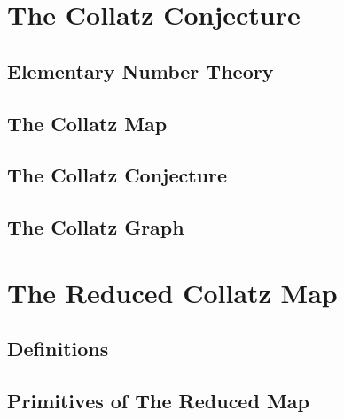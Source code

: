 \begin{abstract}
This is a collection of autoformalizations of definitions and elementary lemmas associated
with the Collatz Conjecture. The focus is first on facts needed to build up recent arguments
by Rozier and Terracol\cite{rozier2025paradoxical}. Secondly, we attempt to be more complete
regarding elementary lemmas to
allow shorter proofs of more advanced theorems. The work is motivated by an urge to understand
current research better, but also by the idea of a specialized library of autoformalizations,
should the need arise for it.
\end{abstract}

\chapter{The Collatz Conjecture}
\section{Elementary Number Theory}


\section{The Collatz Map}


\section{The Collatz Conjecture}


\section{The Collatz Graph}


\chapter{The Reduced Collatz Map}
\section{Definitions}


\section{Primitives of The Reduced Map}


